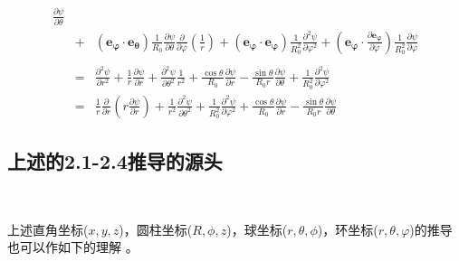 \documentclass[UTF8]{ctexart}
\newcommand{\tmmathbf}[1]{\ensuremath{\boldsymbol{#1}}}
\newenvironment{enumerateroman}{\begin{enumerate}[i.] }{\end{enumerate}}
\begin{document}
\begin{enumerateroman}
\begin{eqnarray}
    \frac{\partial \psi}{\partial \theta} \nonumber\\
    &+& (\tmmathbf{e_{\varphi} \cdot}
    \tmmathbf{e_{\theta}}) \frac{1}{R_0} \frac{\partial \psi}{\partial \theta}
    \frac{\partial}{\partial \varphi} \left( \frac{1}{r} \right) +
    (\tmmathbf{e_{\varphi} \cdot} \tmmathbf{e_{\varphi}}) \frac{1}{R_0^2}
    \frac{\partial^2 \psi}{\partial \varphi^2} + \left( \tmmathbf{e_{\varphi}
    \cdot} \frac{\partial \tmmathbf{e_{\varphi}}}{\partial \varphi} \right)
    \frac{1}{R_0^2} \frac{\partial \psi}{\partial \varphi} \nonumber\\
    &  &  \nonumber\\
    & = & \frac{\partial^2 \psi}{\partial r^2} + \frac{1}{r} \frac{\partial
    \psi}{\partial r} + \frac{\partial^2 \psi}{\partial \theta^2}
    \frac{1}{r^2} + \frac{\cos \theta}{R_0} \frac{\partial \psi}{\partial r} -
    \frac{\sin \theta}{R_0 r} \frac{\partial \psi}{\partial \theta} +
    \frac{1}{R_0^2} \frac{\partial^2 \psi}{\partial \varphi^2} \nonumber\\
    & = & \frac{1}{r} \frac{\partial}{\partial r} \left( r \frac{\partial
    \psi}{\partial r} \right) + \frac{1}{r^2} \frac{\partial^2 \psi}{\partial
    \theta^2} + \frac{1}{R_0^2} \frac{\partial^2 \psi}{\partial \varphi^2} +
    \frac{\cos \theta}{R_0} \frac{\partial \psi}{\partial r} - \frac{\sin
    \theta}{R_0 r} \frac{\partial \psi}{\partial \theta} 
  \end{eqnarray}
\end{enumerateroman}

\subsection{上述的2.1-2.4推导的源头}

\

上述直角坐标($x, y, z$)，圆柱坐标($R, \phi, z$)，球坐标($r,
\theta, \phi$)，环坐标($r, \theta,
\varphi$)的推导也可以作如下的理解 。
\end{document}
